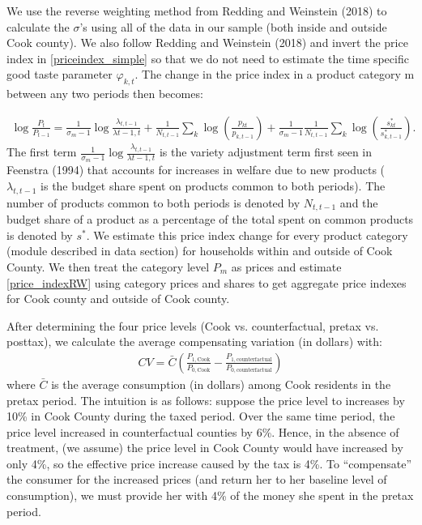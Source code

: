 \documentclass[12pt]{article}
\begin{document}
We use the reverse weighting method from Redding and Weinstein (2018) to calculate the $\sigma$'s using all of the data in our sample (both inside and outside Cook county). We also follow Redding and Weinstein (2018) and invert the price index in \eqref{priceindex_simple} so that we do not need to estimate the time specific good taste parameter $\varphi_{k,t}$. The change in the price index in a product category m between any two periods then becomes:

\begin{align}
    \log \frac{P_t}{P_{t-1}} = \frac{1  }{\sigma_m-1} \log \frac{\lambda_{t,t-1}}{\lambda{t-1,t}} + \frac{1}{N_{t,t-1}} \sum_k \log \left(  \frac{p_{kt}}{p_{k,t-1}}\right) + \frac{1}{\sigma_m -1}\frac{1}{N_{t,t-1}} \sum_k \log\left(\frac{s^*_{kt}}{s^*_{k,t-1}} \right) \label{price_indexRW} .
\end{align}
The first term $\frac{1  }{\sigma_m-1} \log \frac{\lambda_{t,t-1}}{\lambda{t-1,t}}$ is the variety adjustment term first seen in Feenstra (1994) that accounts for increases in welfare due to new products ($\lambda_{t,t-1}$ is the budget share spent on products common to both periods). The number of products common to both periods is denoted by $N_{t,t-1}$ and the budget share of a product as a percentage of the total spent on common products is denoted by $s^*$. We estimate this price index change for every product category (module described in data section) for households within and outside of Cook County. We then treat the category level $P_m$ as prices and estimate \eqref{price_indexRW} using category prices and shares to get aggregate price indexes for Cook county and outside of Cook county. 


 After determining the four price levels (Cook vs. counterfactual, pretax vs. posttax), we  calculate the average compensating variation (in dollars) with:
\begin{align}
CV = \bar{C}\left(\frac{P_{1,\text{Cook}}}{P_{0,\text{Cook}}} - \frac{P_{1,\text{counterfactual}}}{P_{0,\text{counterfactual}}}\right) \label{cv}
\end{align}
where $\bar{C}$ is the average consumption (in dollars) among Cook residents in the pretax period. The intuition is as follows: suppose the price level to increases by 10\% in Cook County during the taxed period. Over the same time period, the price level increased in counterfactual counties by 6\%. Hence, in the absence of treatment, (we assume) the price level in Cook County would have increased by only 4\%, so the effective price increase caused by the tax is 4\%. To ``compensate'' the consumer for the increased prices (and return her to her baseline level of consumption), we must provide her with 4\% of the money she spent in the pretax period.
\end{document}
